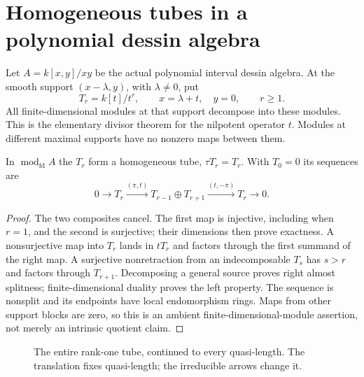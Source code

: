 \section[Homogeneous tubes]{Homogeneous tubes in a polynomial dessin algebra}
Let $A=k[x,y]/xy$ be the actual polynomial interval dessin algebra. At the
smooth support $(x-\lambda,y)$, with $\lambda\ne0$, put
\[
 T_r=k[t]/t^r,\qquad x=\lambda+t,\quad y=0,\qquad r\ge1.
\]
All finite-dimensional modules at that support decompose into these modules.
This is the elementary divisor theorem for the nilpotent operator $t$.
Modules at different maximal supports have no nonzero maps between them.

\begin{proposition}\label{arb:tube}
In $\operatorname{mod}_{\mathrm{fd}}A$ the $T_r$ form a homogeneous tube,
$\tau T_r=T_r$. With $T_0=0$ its sequences are
\[
 0\to T_r\xrightarrow{(\pi,t)}T_{r-1}\oplus T_{r+1}
      \xrightarrow{(t,-\pi)}T_r\to0.
\]
\end{proposition}
\begin{proof}
The two composites cancel. The first map is injective, including when $r=1$,
and the second is surjective; their dimensions then prove exactness.
A nonsurjective map into $T_r$ lands in $tT_r$ and factors through the first
summand of the right map. A surjective nonretraction from an indecomposable
$T_s$ has $s>r$ and factors through $T_{r+1}$. Decomposing a general source
proves right almost splitness; finite-dimensional duality proves the left
property. The sequence is nonsplit and its endpoints have local endomorphism
rings. Maps from other support blocks are zero, so this is an ambient
finite-dimensional-module assertion, not merely an intrinsic quotient claim.
\end{proof}

\begin{figure}[htbp]\centering
{}
\caption{The entire rank-one tube, continued to every quasi-length. The
translation fixes quasi-length; the irreducible arrows change it.}
\end{figure}

